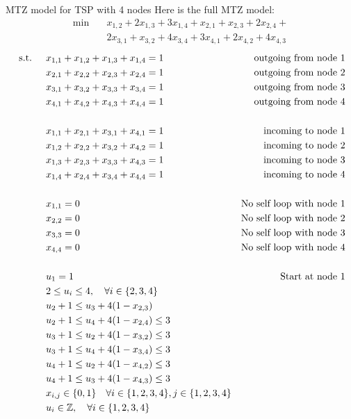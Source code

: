\begin{example}{MTZ model for TSP with 4 nodes}{}
Here is the full MTZ model:
\begin{align*}\min\quad & x_{1,2} + 2 x_{1,3} + 3 x_{1,4} + x_{2,1} + x_{2,3} + 2 x_{2,4} + \\ &2 x_{3,1} + x_{3,2} + 4 x_{3,4} + 3 x_{4,1} + 2 x_{4,2} + 4 x_{4,3}
\end{align*}
\begin{align*}
\mbox{ s.t. } \quad & x_{1,1} + x_{1,2} + x_{1,3} + x_{1,4} = 1& \mbox{ outgoing from node 1}\\
  & x_{2,1} + x_{2,2} + x_{2,3} + x_{2,4} = 1& \mbox{ outgoing from node 2}\\
 & x_{3,1} + x_{3,2} + x_{3,3} + x_{3,4} = 1& \mbox{ outgoing from node 3}\\
 & x_{4,1} + x_{4,2} + x_{4,3} + x_{4,4} = 1& \mbox{ outgoing from node 4}\\
 \\
  & x_{1,1} + x_{2,1} + x_{3,1} + x_{4,1} = 1& \mbox{ incoming to node 1}\\
 & x_{1,2} + x_{2,2} + x_{3,2} + x_{4,2} = 1& \mbox{ incoming to node 2}\\
 & x_{1,3} + x_{2,3} + x_{3,3} + x_{4,3} = 1& \mbox{ incoming to node 3}\\ 
 & x_{1,4} + x_{2,4} + x_{3,4} + x_{4,4} = 1& \mbox{ incoming to node 4}\\
 \\
 & x_{1,1} = 0 & \mbox{No self loop with node 1}\\
 & x_{2,2} = 0& \mbox{No self loop with node 2}\\
 & x_{3,3} = 0& \mbox{No self loop with node 3}\\
 & x_{4,4} = 0& \mbox{No self loop with node 4}\\
 \\
 & u_{1} = 1 & \mbox{Start at node 1}\\
  &2  \leq u_{i} \leq 4, \quad\forall i \in \{2,3,4\}\\
 & u_{2} +1 \leq  u_{3} + 4 (1-x_{2,3})\\
 & u_{2} +1 \leq u_{4} + 4 (1-x_{2,4}) \leq 3\\
 & u_{3} +1 \leq u_{2} + 4 (1-x_{3,2}) \leq 3\\
 & u_{3} +1 \leq u_{4} + 4 (1-x_{3,4}) \leq 3\\
 & u_{4} +1 \leq u_{2} + 4 (1-x_{4,2}) \leq 3\\
 & u_{4} +1 \leq u_{3} + 4 (1-x_{4,3}) \leq 3\\
 & x_{i,j} \in \{0,1\} \quad\forall i\in \{1,2,3,4\}, j \in \{1,2,3,4\}\\
 & u_{i} \in \mathbb{Z}, \quad\forall i \in \{1,2,3,4\}
\end{align*}
\end{example}

